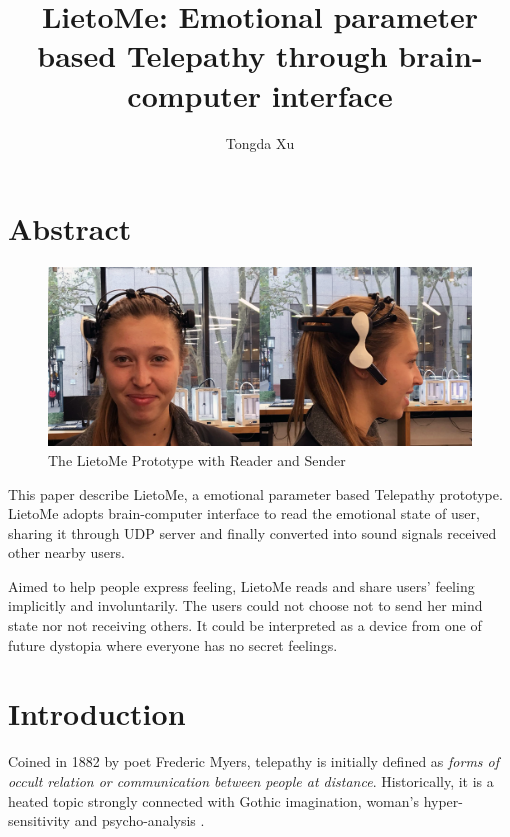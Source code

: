\documentclass[a4paper]{article}
\begin{document}
\title{LietoMe: Emotional parameter based Telepathy through brain-computer interface}
\author{Tongda Xu}
\maketitle

\section{Abstract}

\begin{figure}[H]
	\centering
	\includegraphics[width=\linewidth]{Diagram_1}
	\caption{The LietoMe Prototype with Reader and Sender}
	\label{fig:prototype}
\end{figure}

This paper describe LietoMe, a emotional parameter based Telepathy prototype. LietoMe adopts brain-computer interface to read the emotional state of user, sharing it through UDP server and finally converted into sound signals received other nearby users.

Aimed to help people express feeling, LietoMe reads and share users' feeling implicitly and involuntarily. The users could not choose not to send her mind state nor not receiving others. It could be interpreted as a device from one of future dystopia where everyone has no secret feelings.

\section{Introduction}

Coined in 1882 by poet Frederic Myers, telepathy is initially defined as \textit {forms of occult relation or communication between people at distance}. \autocite{luckhurst2002invention} Historically, it is a heated topic strongly connected with Gothic imagination, woman's hyper-sensitivity and psycho-analysis \autocite{freud1955dreams}.
\end{document}
